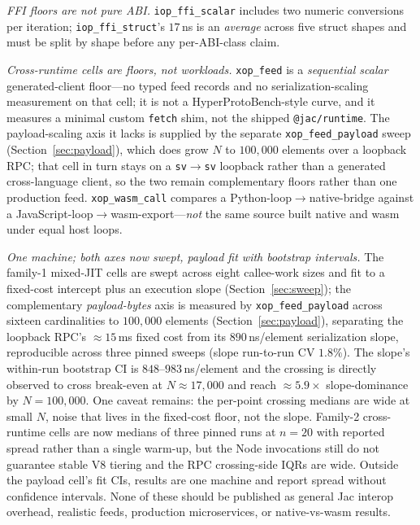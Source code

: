 \documentclass[conference]{IEEEtran}
\newcommand{\code}[1]{\texttt{#1}}
\begin{document}
\emph{FFI floors are not pure ABI.} \code{iop\_ffi\_scalar} includes two numeric
conversions per iteration; \code{iop\_ffi\_struct}'s $17$\,ns is an
\emph{average} across five struct shapes and must be split by shape before any
per-ABI-class claim.

\emph{Cross-runtime cells are floors, not workloads.} \code{xop\_feed} is a
\emph{sequential scalar} generated-client floor---no typed feed records and no
serialization-scaling measurement on that cell; it is not a HyperProtoBench-style
curve, and it measures a minimal custom \code{fetch} shim, not the shipped
\code{@jac/runtime}. The payload-scaling axis it lacks is supplied by the
separate \code{xop\_feed\_payload} sweep (Section~\ref{sec:payload}), which does
grow $N$ to $100{,}000$ elements over a loopback RPC; that cell in turn stays on a
\code{sv$\rightarrow$sv} loopback rather than a generated cross-language client,
so the two remain complementary floors rather than one production feed.
\code{xop\_wasm\_call} compares a Python-loop$\rightarrow$native-bridge against a
JavaScript-loop$\rightarrow$wasm-export---\emph{not} the same source built native
and wasm under equal host loops.

\emph{One machine; both axes now swept, payload fit with bootstrap intervals.} The family-1 mixed-JIT
cells are swept across eight callee-work sizes and fit to a fixed-cost intercept
plus an execution slope (Section~\ref{sec:sweep}); the complementary
\emph{payload-bytes} axis is measured by
\code{xop\_feed\_payload} across sixteen cardinalities to $100{,}000$ elements
(Section~\ref{sec:payload}), separating the loopback RPC's $\approx$$15$\,ms fixed
cost from its $890$\,ns/element serialization slope, reproducible across three
pinned sweeps (slope run-to-run CV $1.8\%$). The slope's within-run bootstrap CI
is $848$--$983$\,ns/element and the crossing is directly observed to cross
break-even at $N\approx17{,}000$ and reach $\approx$$5.9\times$ slope-dominance by
$N{=}100{,}000$. One caveat remains: the per-point crossing medians are wide at
small $N$, noise that lives in the fixed-cost floor, not the slope. Family-2
cross-runtime cells are now medians of three pinned runs at $n{=}20$ with
reported spread rather than a single warm-up, but the Node invocations still do
not guarantee stable V8 tiering and the RPC crossing-side IQRs are wide. Outside
the payload cell's fit CIs, results are one machine and report spread without
confidence intervals. None of these should be published as general Jac interop
overhead, realistic feeds, production microservices, or native-vs-wasm results.
\end{document}
